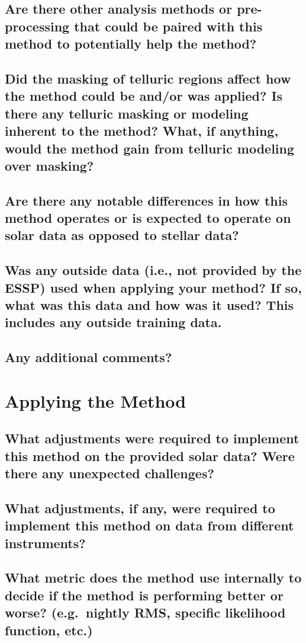 \documentclass[12pt]{article}
\numberwithin{equation}{section}
\begin{document}
\subsection{Are there other analysis methods or pre-processing that could be paired with this method to potentially help the method?}

\subsection{Did the masking of telluric regions affect how the method could be and/or was applied?  Is there any telluric masking or modeling inherent to the method?  What, if anything, would the method gain from telluric modeling over masking?}

\subsection{Are there any notable differences in how this method operates or is expected to operate on solar data as opposed to stellar data?}

\subsection{Was any outside data (i.e., not provided by the ESSP) used when applying your method?  If so, what was this data and how was it used? This includes any outside training data.}

\subsection{Any additional comments?}


\section{Applying the Method}
\subsection{What adjustments were required to implement this method on the provided solar data?  Were there any unexpected challenges?}

\subsection{What adjustments, if any, were required to implement this method on data from different instruments?}

\subsection{What metric does the method use internally to decide if the method is performing better or worse?  (e.g.\ nightly RMS, specific likelihood function, etc.)}
\end{document}
